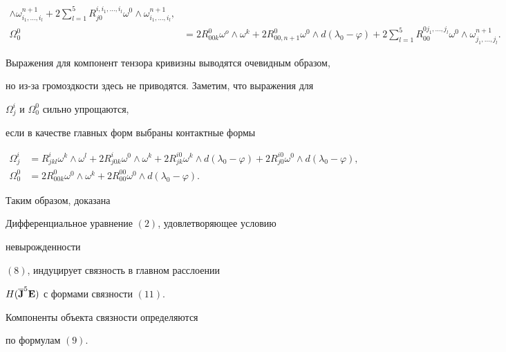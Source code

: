 \begin{notes}
\begin{align*}
\wedge\omega^{n+1}_{i_1,\dotsc,i_l}+ 


2\sum^5_{l=1}R^{i,i_1,\dotsc,i_l}_{j0}\omega^0 


\wedge\omega^{n+1}_{i_1,\dotsc,i_l},\\ 


\Omega^0_0&=2R^0_{00k}\omega^o\wedge\omega^k+ 


2R^0_{00,n+1}\omega^0\wedge d(\lambda_0-\varphi)+ 


2\sum^5_{l=1}R^{0j_1,\dotsc,j_l}_{00}\omega^0 


\wedge\omega^{n+1}_{j_1,\dotsc,j_l}. 


\end{align*} 


Выражения для компонент тензора кривизны выводятся очевидным образом,  


но из-за громоздкости здесь не приводятся. Заметим, что выражения для 


$\Omega^i_j$ и $\Omega^0_0$ сильно упрощаются, 


если в качестве главных форм выбраны контактные формы


\begin{align*} 


\Omega^i_j&=R^i_{jkl}\omega^k\wedge\omega^l+ 


2R^i_{j0k}\omega^0\wedge\omega^k+ 


2R^{i0}_{jk}\omega^k\wedge d(\lambda_0-\varphi)+ 


2R^{i0}_{j0}\omega^0\wedge d(\lambda_0-\varphi),\\ 


\Omega^0_0&=2R^0_{00k}\omega^0\wedge\omega^k+ 


2R^{00}_{00}\omega^0\wedge d(\lambda_0-\varphi). 


\end{align*} 


\end{notes}


 


Таким образом, доказана 


 


\begin{thm} Дифференциальное уравнение $(2)$, удовлетворяющее условию 


невырожденности 


$(8)$, индуцирует связность в главном расслоении 


$H(\overline{\bold J}^5\bold E)$ с формами связности $(11)$. 


Компоненты объекта связности определяются 


по формулам $(9)$. 


\end{thm} 


